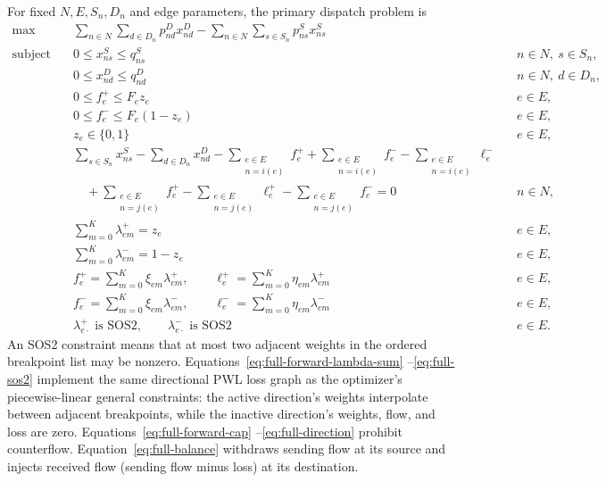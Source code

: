 \documentclass[11pt]{article}
\begin{document}
For fixed \(N,E,S_n,D_n\) and edge parameters, the primary dispatch problem is
\begin{align}
\max\quad
&\sum_{n\in N}\sum_{d\in D_n}p^D_{nd}x^D_{nd}
-\sum_{n\in N}\sum_{s\in S_n}p^S_{ns}x^S_{ns}
\label{eq:full-objective}\\
\text{subject to}\quad
&0\le x^S_{ns}\le q^S_{ns}
&&n\in N,\ s\in S_n,
\label{eq:full-supply}\\
&0\le x^D_{nd}\le q^D_{nd}
&&n\in N,\ d\in D_n,
\label{eq:full-demand}\\
&0\le f_e^+\le F_ez_e
&&e\in E,
\label{eq:full-forward-cap}\\
&0\le f_e^-\le F_e(1-z_e)
&&e\in E,
\label{eq:full-reverse-cap}\\
&z_e\in\{0,1\}
&&e\in E,
\label{eq:full-direction}\\
&\sum_{s\in S_n}x^S_{ns}-\sum_{d\in D_n}x^D_{nd}
-\sum_{\substack{e\in E\\n=i(e)}}f_e^+
+\sum_{\substack{e\in E\\n=i(e)}}f_e^-
-\sum_{\substack{e\in E\\n=i(e)}}\ell_e^-
\nonumber\\
&\quad
+\sum_{\substack{e\in E\\n=j(e)}}f_e^+
-\sum_{\substack{e\in E\\n=j(e)}}\ell_e^+
-\sum_{\substack{e\in E\\n=j(e)}}f_e^-=0
&&n\in N,
\label{eq:full-balance}\\
&\sum_{m=0}^{K}\lambda^+_{em}=z_e
&&e\in E,
\label{eq:full-forward-lambda-sum}\\
&\sum_{m=0}^{K}\lambda^-_{em}=1-z_e
&&e\in E,
\label{eq:full-reverse-lambda-sum}\\
&f_e^+=\sum_{m=0}^{K}\xi_{em}\lambda^+_{em},
\qquad
\ell_e^+=\sum_{m=0}^{K}\eta_{em}\lambda^+_{em}
&&e\in E,
\label{eq:full-forward-pwl}\\
&f_e^-=\sum_{m=0}^{K}\xi_{em}\lambda^-_{em},
\qquad
\ell_e^-=\sum_{m=0}^{K}\eta_{em}\lambda^-_{em}
&&e\in E,
\label{eq:full-reverse-pwl}\\
&\lambda^+_{e\cdot}\text{ is SOS2},\qquad
\lambda^-_{e\cdot}\text{ is SOS2}
&&e\in E.
\label{eq:full-sos2}
\end{align}
An SOS2 constraint means that at most two adjacent weights in the ordered
breakpoint list may be nonzero. Equations~\ref{eq:full-forward-lambda-sum}
--\ref{eq:full-sos2} implement the same directional PWL loss graph as the
optimizer's piecewise-linear general constraints: the active direction's
weights interpolate between adjacent breakpoints, while the inactive
direction's weights, flow, and loss are zero. Equations~\ref{eq:full-forward-cap}
--\ref{eq:full-direction} prohibit counterflow. Equation~\ref{eq:full-balance}
withdraws sending flow at its source and injects received flow (sending flow
minus loss) at its destination.
\end{document}
